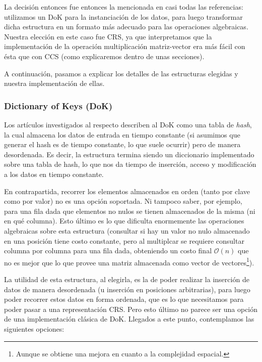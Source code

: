 \par La decisi\'on entonces fue entonces la mencionada en casi todas las
referencias: utilizamos un DoK para la instanciaci\'on de los datos, para luego
transformar dicha estructura en un formato m\'as adecuado para las operaciones
algebraicas. Nuestra elecci\'on en este caso fue CRS, ya que interpretamos que
la implementaci\'on de la operaci\'on multiplicaci\'on matriz-vector era m\'as
f\'acil con \'esta que con CCS (como explicaremos dentro de unas secciones).

\par A continuaci\'on, pasamos a explicar los detalles de las estructuras
elegidas y nuestra implementaci\'on de ellas.

\subsubsection{Dictionary of Keys (DoK)}
\par Los art\'iculos investigados al respecto describen al DoK como una tabla de
\emph{hash}, la cual almacena los datos de entrada en tiempo constante (si
asumimos que generar el hash es de tiempo constante, lo que suele ocurrir) pero
de manera desordenada. Es decir, la estructura termina siendo un diccionario
implementado sobre una tabla de hash, lo que nos da tiempo de inserci\'on,
acceso y modificaci\'on a los datos en tiempo constante.

\par En contrapartida, recorrer los elementos almacenados en orden (tanto por
clave como por valor) no es una opci\'on soportada. Ni tampoco saber, por
ejemplo, para una fila dada que elementos no nulos se tienen almacenados de la
misma (ni en qué columna). Esto \'ultimo es lo que dificulta enormemente las
operaciones algebraicas sobre esta estructura (consultar si hay un valor no
nulo almacenado en una posici\'on tiene costo constante, pero al multiplcar se
requiere consultar columna por columna para una fila dada, obteniendo un costo
final $\mathcal{O}(n)$ que no es mejor que lo que provee una matriz almacenada
como vector de vectores\footnote{Aunque se obtiene una mejora en cuanto a la
complejidad espacial.}).

\par La utilidad de esta estructura, al elegirla, es la de poder realizar la
inserci\'on de datos de manera desordenada (u inserci\'on en posiciones
arbitrarias), para luego poder recorrer estos datos en forma ordenada, que es lo
que necesitamos para poder pasar a una representaci\'on CRS. Pero esto \'ultimo
no parece ser una opci\'on de una implementaci\'on cl\'asica de DoK. Llegados a
este punto, contemplamos las siguientes opciones:


